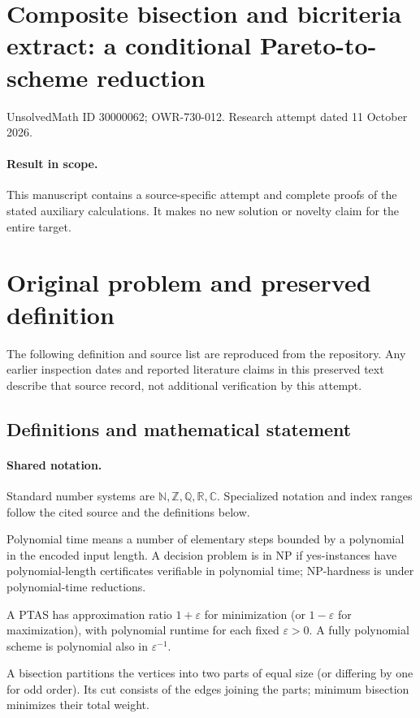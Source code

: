 \documentclass[11pt]{article}
\begin{document}
\section*{Composite bisection and bicriteria extract: a conditional Pareto-to-scheme reduction}
\noindent UnsolvedMath ID 30000062; OWR-730-012. Research attempt dated 11 October 2026.
\paragraph{Result in scope.}This manuscript contains a source-specific attempt and complete proofs of the stated auxiliary calculations. It makes no new solution or novelty claim for the entire target.
\section{Original problem and preserved definition}
The following definition and source list are reproduced from the repository. Any earlier inspection dates and reported literature claims in this preserved text describe that source record, not additional verification by this attempt.
\subsection{Definitions and mathematical statement}

\paragraph{Shared notation.}Standard number systems are $\mathbb N,\mathbb Z,\mathbb Q,\mathbb R,\mathbb C$. Specialized notation and index ranges follow the cited source and the definitions below.


Polynomial time means a number of elementary steps bounded by a polynomial in the encoded input length. A decision problem is in $\mathrm{NP}$ if yes-instances have polynomial-length certificates verifiable in polynomial time; NP-hardness is under polynomial-time reductions.

A PTAS has approximation ratio $1+\varepsilon$ for minimization (or $1-\varepsilon$ for maximization), with polynomial runtime for each fixed $\varepsilon>0$. A fully polynomial scheme is polynomial also in $\varepsilon^{-1}$.

A bisection partitions the vertices into two parts of equal size (or differing by one for odd order). Its cut consists of the edges joining the parts; minimum bisection minimizes their total weight.
\end{document}
